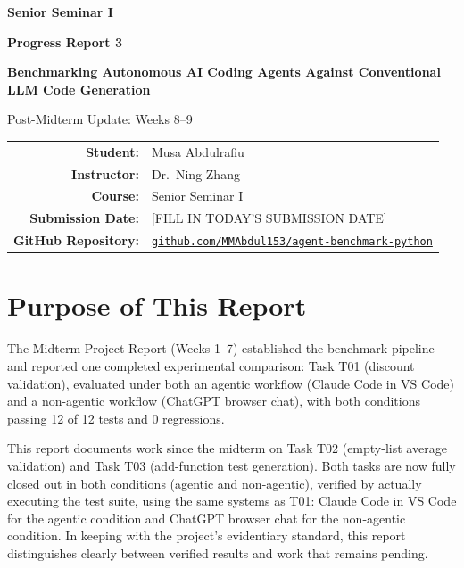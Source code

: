 \documentclass[12pt]{article}
\newcommand{\SubmissionDate}{[FILL IN TODAY'S SUBMISSION DATE]}
\newcommand{\RepoURL}{https://github.com/MMAbdul153/agent-benchmark-python}
\newcommand{\StudentName}{Musa Abdulrafiu}
\newcommand{\InstructorName}{Dr.\ Ning Zhang}
\newcommand{\CourseName}{Senior Seminar I}
\newcommand{\AgentName}{Claude Code in VS Code}
\newcommand{\LLMName}{ChatGPT browser chat}
\begin{document}
\begin{titlepage}
    \centering
    \vspace*{1.15in}

    {\Large \textbf{\CourseName}\par}
    \vspace{0.35in}

    {\LARGE \textbf{Progress Report 3}\par}
    \vspace{0.25in}

    {\Large \textbf{Benchmarking Autonomous AI Coding Agents Against Conventional LLM Code Generation}\par}
    \vspace{0.2in}

    {\large Post-Midterm Update: Weeks 8--9\par}

    \vfill

    \begin{tabular}{rl}
        \textbf{Student:} & \StudentName \\
        \textbf{Instructor:} & \InstructorName \\
        \textbf{Course:} & \CourseName \\
        \textbf{Submission Date:} & \SubmissionDate \\
        \textbf{GitHub Repository:} &
        \href{\RepoURL}{\texttt{github.com/MMAbdul153/agent-benchmark-python}} \\
    \end{tabular}

    \vfill
\end{titlepage}

\section{Purpose of This Report}

The Midterm Project Report (Weeks 1--7) established the benchmark pipeline and
reported one completed experimental comparison: Task T01 (discount validation),
evaluated under both an agentic workflow (\AgentName) and a non-agentic workflow
(\LLMName), with both conditions passing 12 of 12 tests and 0 regressions.

This report documents work since the midterm on Task T02 (empty-list average
validation) and Task T03 (add-function test generation). Both tasks are now
fully closed out in both conditions (agentic and non-agentic), verified by
actually executing the test suite, using the same systems as T01: \AgentName{}
for the agentic condition and \LLMName{} for the non-agentic condition. In
keeping with the project's evidentiary standard, this report distinguishes
clearly between verified results and work that remains pending.
\end{document}
